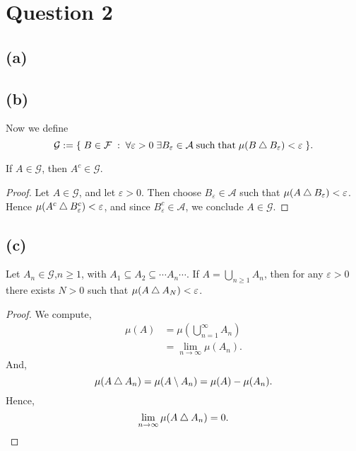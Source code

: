 \documentclass{unswmaths}
\begin{document}
\section*{Question 2}

\subsection*{(a)}
\begin{lemma}
    
\end{lemma}

\subsection*{(b)}
Now we define
\begin{equation*}
    \mathcal{G} := \{\;B \in \mathcal{F}\;:\;\forall\varepsilon > 0\;\exists B_\varepsilon \in \mathcal{A}\;\text{such}\;\text{that}\;\mu(B\bigtriangleup B_\varepsilon) < \varepsilon\;\}.
\end{equation*}
\begin{lemma}
    If $A \in \mathcal{G}$, then $A^c \in \mathcal{G}$.
\end{lemma}
\begin{proof}
    Let $A \in \mathcal{G}$, and let $\varepsilon > 0$. Then choose $B_\varepsilon \in \mathcal{A}$
    such that $\mu(A \bigtriangleup B_\varepsilon) < \varepsilon$. Hence $\mu(A^c \bigtriangleup B^c_\varepsilon) < \varepsilon$,
    and since $B^c_\varepsilon \in \mathcal{A}$, we conclude $A \in \mathcal{G}$.
\end{proof}
\subsection*{(c)}
\begin{lemma}
    Let $A_n \in \mathcal{G}$,$n \geq 1$, with $A_1 \subseteq A_2 \subseteq \cdots A_n \cdots$. 
    If $A = \bigcup_{n\geq 1} A_n$, then 
    for any $\varepsilon > 0$ there exists $N > 0$ such that $\mu(A\bigtriangleup A_N) < \varepsilon$.
\end{lemma}
\begin{proof}
    We compute,
    \begin{align*}
        \mu(A) &= \mu(\bigcup_{n=1}^\infty A_n)\\
        &= \lim_{n\rightarrow\infty} \mu(A_n).
    \end{align*}
    And, 
    \begin{equation*}
        \mu(A\bigtriangleup A_n) = \mu(A\setminus A_n) = \mu(A)-\mu(A_n).
    \end{equation*}
    Hence,
    \begin{equation*}
        \lim_{n\rightarrow\infty} \mu(A\bigtriangleup A_n) = 0.
    \end{equation*}
\end{proof}
\end{document}
